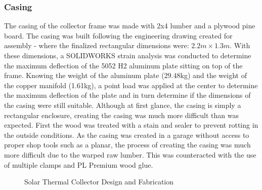 \subsubsection{Casing}

The casing of the collector frame was made with 2x4 lumber and a plywood pine board. The casing was built following the engineering drawing created for assembly - where the finalized rectangular dimensions were: $2.2m \times 1.3m$. With these dimensions, a SOLIDWORKS strain analysis was conducted to determine the maximum deflection of the 5052 H2 aluminum plate sitting on top of the frame. Knowing the weight of the aluminum plate (29.48kg) and the weight of the copper manifold (1.61kg), a point load was applied at the center to determine the maximum deflection of the plate and in turn determine if the dimensions of the casing were still suitable. Although at first glance, the casing is simply a rectangular enclosure, creating the casing was much more difficult than was expected. First the wood was treated with a stain and sealer to prevent rotting in the outside conditions. As the casing was created in a garage without access to proper shop tools such as a planar, the process of creating the casing was much more difficult due to the warped raw lumber. This was counteracted with the use of multiple clamps and PL Premium wood glue.

\begin{figure}[ht]
    \centering
    \qquad
    \caption{Solar Thermal Collector Design and Fabrication}
\end{figure}

